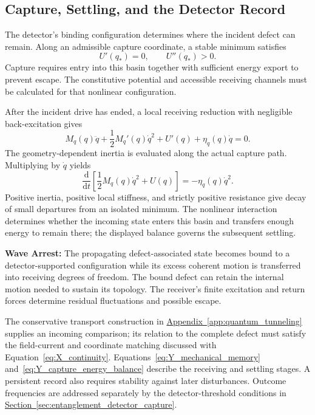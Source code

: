 \subsection{Capture, Settling, and the Detector Record}
\label{sec:Y_capture}

The detector's binding configuration determines where the incident defect can remain. Along an admissible capture coordinate, a stable minimum satisfies
\begin{equation}
    U'(q_*)=0,
    \qquad U''(q_*)>0.
\end{equation}
Capture requires entry into this basin together with sufficient energy export to prevent escape. The constitutive potential and accessible receiving channels must be calculated for that nonlinear configuration.

After the incident drive has ended, a local receiving reduction with negligible back-excitation gives
\begin{equation}
    M_q(q)\ddot q+\frac12M_q'(q)\dot q^2
    +U'(q)+\eta_q(q)\dot q=0.
\end{equation}
The geometry-dependent inertia is evaluated along the actual capture path. Multiplying by $\dot q$ yields
\begin{equation}
    \boxed{
    \frac{\mathrm d}{\mathrm dt}
    \left[\frac12M_q(q)\dot q^2+U(q)\right]
    =-\eta_q(q)\dot q^2
    }.
    \label{eq:Y_capture_energy_balance}
\end{equation}
Positive inertia, positive local stiffness, and strictly positive resistance give decay of small departures from an isolated minimum. The nonlinear interaction determines whether the incoming state enters this basin and transfers enough energy to remain there; the displayed balance governs the subsequent settling.

\noindent\textbf{Wave Arrest:}
The propagating defect-associated state becomes bound to a detector-supported configuration while its excess coherent motion is transferred into receiving degrees of freedom. The bound defect can retain the internal motion needed to sustain its topology. The receiver's finite excitation and return forces determine residual fluctuations and possible escape.

The conservative transport construction in \hyperref[app:quantum_tunneling]{Appendix~\ref*{app:quantum_tunneling}} supplies an incoming comparison; its relation to the complete defect must satisfy the field-current and coordinate matching discussed with Equation~\eqref{eq:X_continuity}. Equations~\eqref{eq:Y_mechanical_memory} and~\eqref{eq:Y_capture_energy_balance} describe the receiving and settling stages. A persistent record also requires stability against later disturbances. Outcome frequencies are addressed separately by the detector-threshold conditions in \hyperref[sec:entanglement_detector_capture]{Section~\ref*{sec:entanglement_detector_capture}}.

